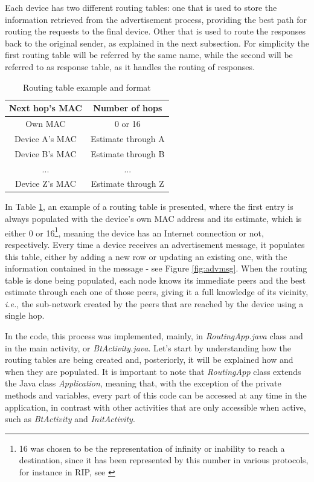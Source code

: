 Each device has two different routing tables: one that is used to store the information retrieved from the advertisement process, providing the best path for routing the requests to the final device. Other that is used to route the responses back to the original sender, as explained in the next subsection. For simplicity the first routing table will be referred by the same name, while the second will be referred to as response table, as it handles the routing of responses.

\begin{table}[ht]
\centering
\bgroup
\def\arraystretch{2.5}
\begin{tabular}{|c|c|}
\hline
\textbf{Next hop's MAC} & \textbf{Number of hops} \\ \hline
Own MAC & 0 or 16 \\ \hline
Device A's MAC & Estimate through A \\ \hline
Device B's MAC & Estimate through B \\ \hline
... & ... \\ \hline
Device Z's MAC & Estimate through Z \\ \hline
\end{tabular}
\egroup
\caption{Routing table example and format}
\label{tab:routTables}
\end{table}

In Table \ref{tab:routTables}, an example of a routing table is presented, where the first entry is always populated with the device's own \gls{MAC} address and its estimate, which is either 0 or 16\footnote{16 was chosen to be the representation of infinity or inability to reach a destination, since it has been represented by this number in various protocols, for instance in \gls{RIP}, see \cite{ripprotocol}}, meaning the device has an Internet connection or not, respectively. Every time a device receives an advertisement message, it populates this table, either by adding a new row or updating an existing one, with the information contained in the message - see Figure \ref{fig:advmsg}. When the routing table is done being populated, each node knows its immediate peers and the best estimate through each one of those peers, giving it a full knowledge of its vicinity, \textit{i.e.}, the sub-network created by the peers that are reached by the device using a single hop.

In the code, this process was implemented, mainly, in \textit{RoutingApp.java} class and in the main activity, or \textit{BtActivity.java}. Let's start by understanding how the routing tables are being created and, posteriorly, it will be explained how and when they are populated. It is important to note that \textit{RoutingApp} class extends the Java class \textit{Application}, meaning that, with the exception of the private methods and variables, every part of this code can be accessed at any time in the application, in contrast with other activities that are only accessible when active, such as \textit{BtActivity} and \textit{InitActivity}.


